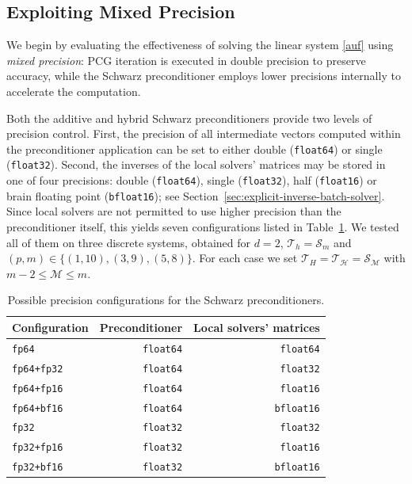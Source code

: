 \documentclass[11pt]{article}
\theoremstyle{definition}
\theoremstyle{theorem}
\begin{document}
\subsection{Exploiting Mixed Precision}
\label{sec:precision-experiments}

We begin by evaluating the effectiveness of solving the linear system \eqref{auf}
using \emph{mixed precision}: PCG iteration is executed in double precision
to preserve accuracy, while the Schwarz preconditioner employs lower precisions
internally to accelerate the computation.

Both the additive and hybrid Schwarz preconditioners provide two levels of precision
control. First, the precision of all intermediate vectors computed within the preconditioner
application can be set to either double (\verb|float64|) or single (\verb|float32|).
Second, the inverses of the local solvers' matrices may be stored in one of four
precisions: double (\verb|float64|), single (\verb|float32|), half (\verb|float16|)
or brain floating point (\verb|bfloat16|); see Section~\ref{sec:explicit-inverse-batch-solver}.
Since local solvers are not permitted to use higher precision than the preconditioner itself,
this yields seven configurations listed in Table~\ref{tab:precision-configurations}.
We tested all of them on three discrete systems,
obtained for $d=2$, $\mathcal{T}_h=\mathcal{S}_m$ and
$(p, m)\in \{(1, 10), (3, 9), (5, 8)\}$. For each case we set
$\mathcal{T}_H=\mathcal{T}_{\mathcal{H}}=\mathcal{S}_\mathcal{M}$ with
$m-2\leq \mathcal{M}\leq m$.

\begin{table}
  \centering
  \caption{Possible precision configurations for the Schwarz preconditioners.}
  \label{tab:precision-configurations}
  \begin{tabular}{lrr}
    \toprule
    Configuration & Preconditioner & Local solvers' matrices \\
    \midrule
    \verb|fp64| & \verb|float64| & \verb|float64| \\
    \verb|fp64+fp32| & \verb|float64| & \verb|float32| \\
    \verb|fp64+fp16| & \verb|float64| & \verb|float16| \\
    \verb|fp64+bf16| & \verb|float64| & \verb|bfloat16| \\
    \verb|fp32| & \verb|float32| & \verb|float32| \\
    \verb|fp32+fp16| & \verb|float32| & \verb|float16| \\
    \verb|fp32+bf16| & \verb|float32| & \verb|bfloat16| \\
    \bottomrule
  \end{tabular}
\end{table}
\end{document}
